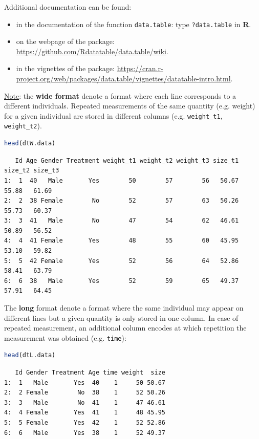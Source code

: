 \documentclass{article}
\newcommand\Rlogo{\textbf{\textsf{R}}\xspace}
\begin{document}
\bigskip

Additional documentation can be found:
\begin{itemize}
\item in the documentation of the function \texttt{data.table}: type \texttt{?data.table} in \Rlogo.
\item on the webpage of the package: \url{https://github.com/Rdatatable/data.table/wiki}.
\item in the vignettes of the package: \url{https://cran.r-project.org/web/packages/data.table/vignettes/datatable-intro.html}.
\end{itemize}

\bigskip

\uline{Note}: the \textbf{wide format} denote a format where each line corresponds
to a different individuals. Repeated measurements of the same quantity
(e.g. weight) for a given individual are stored in different columns
(e.g. \texttt{weight\_t1}, \texttt{weight\_t2}).

\begin{lstlisting}[language=r,numbers=none]
head(dtW.data)
\end{lstlisting}

\label{}
\begin{verbatim}
   Id Age Gender Treatment weight_t1 weight_t2 weight_t3 size_t1 size_t2 size_t3
1:  1  40   Male       Yes        50        57        56   50.67   55.88   61.69
2:  2  38 Female        No        52        57        63   50.26   55.73   60.37
3:  3  41   Male        No        47        54        62   46.61   50.89   56.52
4:  4  41 Female       Yes        48        55        60   45.95   53.10   59.82
5:  5  42 Female       Yes        52        56        64   52.86   58.41   63.79
6:  6  38   Male       Yes        52        59        65   49.37   57.91   64.45
\end{verbatim}


 The \textbf{long} format denote a format where the same individual may
appear on different lines but a given quantity is only stored in one
column. In case of repeated measurement, an additional column encodes
at which repetition the measurement was obtained (e.g. \texttt{time}):
\begin{lstlisting}[language=r,numbers=none]
head(dtL.data)
\end{lstlisting}

\label{}
\begin{verbatim}
   Id Gender Treatment Age time weight  size
1:  1   Male       Yes  40    1     50 50.67
2:  2 Female        No  38    1     52 50.26
3:  3   Male        No  41    1     47 46.61
4:  4 Female       Yes  41    1     48 45.95
5:  5 Female       Yes  42    1     52 52.86
6:  6   Male       Yes  38    1     52 49.37
\end{verbatim}
\end{document}
